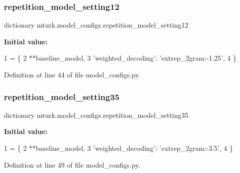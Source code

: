 \subsubsection{\texorpdfstring{repetition\+\_\+model\+\_\+setting12}{repetition\_model\_setting12}}
{\footnotesize\ttfamily dictionary mturk.\+model\+\_\+configs.\+repetition\+\_\+model\+\_\+setting12}

{\bfseries Initial value\+:}
\begin{DoxyCode}
1 =  \{
2     **baseline\_model,
3     \textcolor{stringliteral}{'weighted\_decoding'}: \textcolor{stringliteral}{'extrep\_2gram:-1.25'},
4 \}
\end{DoxyCode}


Definition at line 44 of file model\+\_\+configs.\+py.

\mbox{\label{namespacemturk_1_1model__configs_a5af85bdfecc335b56ed3399d5aa82709}} 
\subsubsection{\texorpdfstring{repetition\+\_\+model\+\_\+setting35}{repetition\_model\_setting35}}
{\footnotesize\ttfamily dictionary mturk.\+model\+\_\+configs.\+repetition\+\_\+model\+\_\+setting35}

{\bfseries Initial value\+:}
\begin{DoxyCode}
1 =  \{
2     **baseline\_model,
3     \textcolor{stringliteral}{'weighted\_decoding'}: \textcolor{stringliteral}{'extrep\_2gram:-3.5'},
4 \}
\end{DoxyCode}


Definition at line 49 of file model\+\_\+configs.\+py.

\mbox{\label{namespacemturk_1_1model__configs_a87a00f4205e0049773d34284a4a10de2}} 

